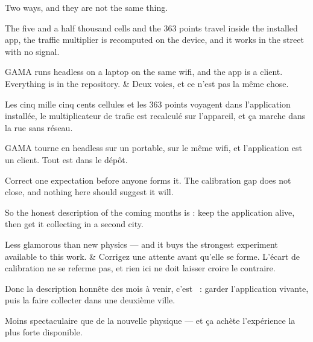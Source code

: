\documentclass[10pt,a4paper]{article}
\begin{document}
\begin{say}
Two ways, and they are not the same thing.

 The five and a half thousand cells and the
363 points travel inside the installed app, the traffic multiplier is recomputed
on the device, and it works in the street with no signal.

 GAMA runs headless on a
laptop on the same wifi, and the app is a client.  Everything is in the repository.
&
Deux voies, et ce n'est pas la même chose.

 Les cinq mille cinq cents cellules et les 363
points voyagent dans l'application installée, le multiplicateur de trafic est
recalculé sur l'appareil, et ça marche dans la rue sans réseau.

 GAMA tourne en headless
sur un portable, sur le même wifi, et l'application est un client.  Tout est dans le dépôt.
\end{say}

\begin{say}
Correct one expectation before anyone forms it.  The calibration gap does not close, and nothing
here should suggest it will.

So the honest description of the coming months is : keep the application alive, then get it collecting in a second city.

Less glamorous than new physics --- and it buys the strongest experiment available
to this work.
&
Corrigez une attente avant qu'elle se forme.  L'écart de calibration ne se referme pas, et rien ici ne
doit laisser croire le contraire.

Donc la description honnête des mois à venir, c'est ~: garder l'application vivante, puis la faire collecter dans une
deuxième ville.

Moins spectaculaire que de la nouvelle physique --- et ça achète l'expérience la
plus forte disponible.
\end{say}
\end{document}
